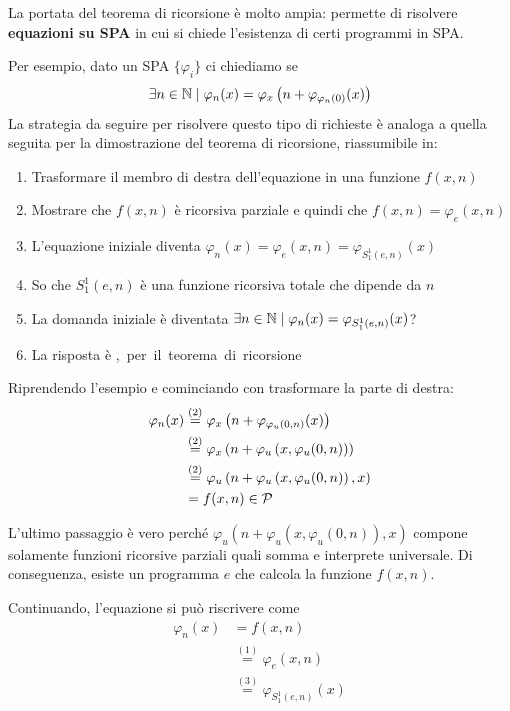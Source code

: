 La portata del teorema di ricorsione è molto ampia: permette di risolvere \textbf{equazioni su SPA} in cui si chiede l'esistenza di certi programmi in SPA.

Per esempio, dato un SPA $\{\varphi_i\}$ ci chiediamo se
$$ \exists n \in \mathbb{N} \mid \varphi_n (x) = \varphi_x \left(n + \varphi_{\varphi_n (0)} (x) \right) $$
La strategia da seguire per risolvere questo tipo di richieste è analoga a quella seguita per la dimostrazione del teorema di ricorsione, riassumibile in:
\begin{enumerate}
	\item Trasformare il membro di destra dell'equazione in una funzione $f(x,n)$
	\item Mostrare che $f(x,n)$ è ricorsiva parziale e quindi che $f(x,n) = \varphi_e (x,n)$
	\item L'equazione iniziale diventa $\varphi_n (x) = \varphi_e (x, n) = \varphi_{S^1_1 (e,n)} (x)$
	\item So che $S^1_1 (e,n)$ è una funzione ricorsiva totale che dipende da $n$
	\item La domanda iniziale è diventata $\exists n \in \mathbb{N} \mid \varphi_n (x) = \varphi_{S_1^1 (e,n)} (x)$?
	\item La risposta è \si, per il teorema di ricorsione
\end{enumerate}

Riprendendo l'esempio e cominciando con trasformare la parte di destra:
\begin{align*}
	\varphi_n (x) & \stackrel{(2)}{=} \varphi_x \left(n + \varphi_{\varphi_u (0,n)} (x)\right) \\
	& \stackrel{(2)}{=} \varphi_x \left(n + \varphi_u \left(x, \varphi_u (0,n)\right)\right) \\
	& \stackrel{(2)}{=} \varphi_u \left(n + \varphi_u \left(x, \varphi_u (0,n)\right), x\right) \\
	& = f(x,n) \in \mathcal{P}
\end{align*}

\vspace{-1em}

L'ultimo passaggio è vero perché $\varphi_u \left(n + \varphi_u \left(x, \varphi_u (0,n)\right), x\right)$ compone solamente funzioni ricorsive parziali quali somma e interprete universale. Di conseguenza, esiste un programma $e$ che calcola la funzione $f(x,n)$.

Continuando, l'equazione si può riscrivere come
\begin{align*}
	\varphi_n (x) & = f(x,n) \\
	& \stackrel{(1)}{=} \varphi_e (x,n) \\
	& \stackrel{(3)}{=} \varphi_{S_1^1 (e,n)} (x)
\end{align*}

